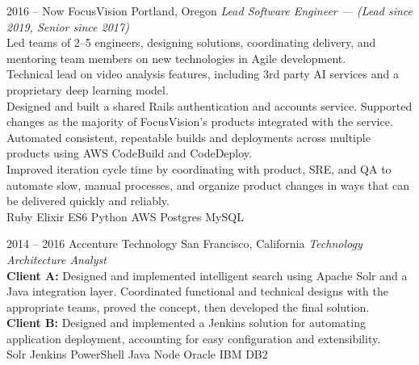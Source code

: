 \documentclass[]{friggeri-cv} %
\begin{document}
\begin{entrylist}


\entry
{2016 -- Now}
{FocusVision}
{Portland, Oregon}
{
  \emph{Lead Software Engineer --- (Lead since 2019, Senior since 2017) } \\
    Led teams of 2--5 engineers, designing solutions, coordinating delivery,
    and mentoring team members on new technologies in Agile development.
    \\
    Technical lead on video analysis features, including 3rd party AI services and
    a proprietary deep learning model.
    \\
    Designed and built a shared Rails authentication and accounts service. Supported
    changes as the majority of FocusVision's products integrated with the service.
    \\
    Automated consistent, repeatable builds and deployments across multiple products using AWS CodeBuild and CodeDeploy.
    \\
    Improved iteration cycle time by coordinating with product, SRE, and QA to
    automate slow, manual processes, and organize product changes in ways that can be
    delivered quickly and reliably.
    \\
Ruby \mydot Elixir \mydot ES6 \mydot Python \mydot AWS \mydot Postgres \mydot MySQL}

\entry
{2014 -- 2016}
{Accenture Technology}
{San Francisco, California}
{\emph{Technology Architecture Analyst} \\
    \textbf{Client A:} Designed and implemented intelligent search using Apache Solr and a Java integration layer. Coordinated functional and technical designs with the appropriate teams, proved the concept, then developed the final solution.
    \\
    \textbf{Client B:} Designed and implemented a Jenkins solution for automating application deployment, accounting for easy configuration and extensibility.
    \\
Solr \mydot Jenkins \mydot PowerShell \mydot Java \mydot Node \mydot Oracle \mydot IBM DB2}


\end{entrylist}
\end{document}
